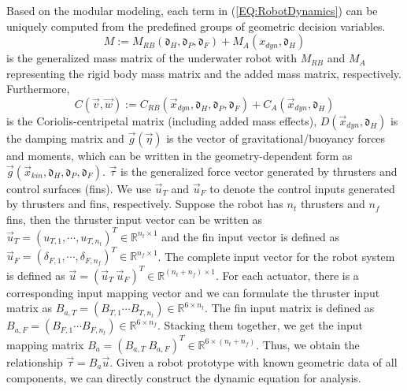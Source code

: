 Based on the modular modeling, each term in (\ref{EQ:RobotDynamics}) can be uniquely computed from the predefined groups of geometric decision variables. 
\begin{equation}
M:=M_{RB}(\mathfrak{d}_{H}, \mathfrak{d}_{P}, \mathfrak{d}_{F})+M_{A}(x_{dyn}, \mathfrak{d}_{H})  
\end{equation} 
is the generalized mass matrix of the underwater robot with $M_{RB}$ and $M_{A}$ representing the rigid body mass matrix and the added mass matrix, respectively. Furthermore, 
\begin{equation}
   C(\vec{v},\vec{w}):=C_{RB}(\vec{x}_{dyn}, \mathfrak{d}_{H}, \mathfrak{d}_{P}, \mathfrak{d}_{F})+C_{A}(\vec{x}_{dyn}, \mathfrak{d}_{H})
 \end{equation} is the Coriolis-centripetal matrix (including added mass effects), $D(\vec{x}_{dyn}, \mathfrak{d}_{H})$ is the damping matrix and $\vec{g}(\vec{\eta})$ is the vector of gravitational/buoyancy forces and moments, which can be written in the geometry-dependent form as $\vec{g}({\vec{x}_{kin}, \mathfrak{d}_{H}, \mathfrak{d}_{P}, \mathfrak{d}_{F}})$. $\vec{\tau}$ is the generalized force vector generated by thrusters and control surfaces (fins). We use $\vec{u}_{T}$ and $\vec{u}_{F}$ to denote the control inputs generated by thrusters and fins, respectively. Suppose the robot has $n_{t}$ thrusters and $n_{f}$ fins, then the thruster input vector can be written as $\vec{u}_{T}=(u_{T,1}, \cdots, u_{T,n_{t}})^{T} \in \mathbb{R}^{n_{t} \times 1}$ and the fin input vector is defined as $\vec{u}_{F}=(\delta_{F,1}, \cdots, \delta_{F,n_{f}})^{T} \in \mathbb{R}^{n_{f} \times 1}$. The complete input vector for the robot system is defined as $\vec{u}=(\vec{u}_{T}~\vec{u}_{F})^{T} \in \mathbb{R}^{(n_{t}+n_{f}) \times 1}$. For each actuator, there is a corresponding input mapping vector and we can formulate the thruster input matrix as $B_{a,T}=(B_{T,1} \cdots B_{T,n_{t}})\in \mathbb{R}^{6\times n_{t}}$. The fin input matrix is defined as $B_{a,F}=(B_{F,1} \cdots B_{F,n_{t}})\in \mathbb{R}^{6\times n_{f}}$. Stacking them together, we get the input mapping matrix $B_{a}=(B_{a,T}~B_{a,F})^{T} \in \mathbb{R}^{6 \times (n_{t}+n_{f})}$. Thus, we obtain the relationship $\vec{\tau}=B_{a}\vec{u}$. Given a robot prototype with known geometric data of all components, we can directly construct the dynamic equation for analysis. 

